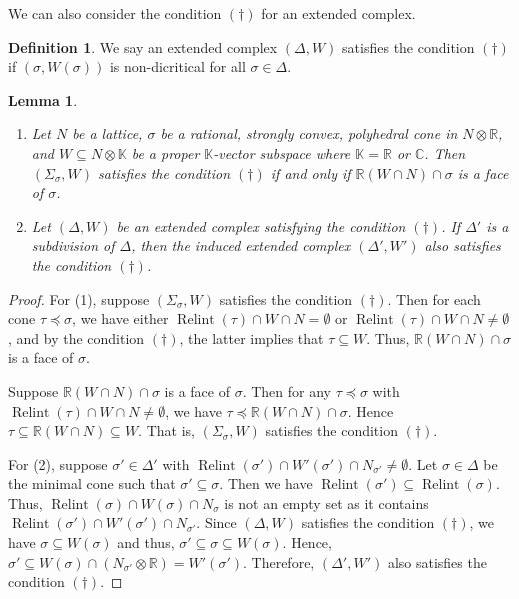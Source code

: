 \documentclass[12pt,reqno]{amsart}
\newtheorem{lemma}[theorem]{Lemma}
\theoremstyle{definition}
\newtheorem{definition}[theorem]{Definition}
\newcommand{\mb}{\mathbb}
\newcommand{\on}{\operatorname}
\newcommand\bC{{\mathbb C}}
\newcommand\bK{{\mathbb K}}
\newcommand\bR{{\mathbb R}}
\begin{document}
We can also consider the condition $(\dagger)$ for an extended complex.
\begin{definition}\label{def:dagger_extended_complex}
    We say an extended complex $(\Delta,W)$ satisfies the condition $(\dagger)$ if $(\sigma,W(\sigma))$ is non-dicritical for all $\sigma\in\Delta$.
\end{definition}

\begin{lemma}\label{lem_property_dagger}
\begin{enumerate}
    \item  Let $N$ be a lattice, $\sigma$ be a rational, strongly convex, polyhedral cone in $N\otimes\bR$, and $W\subseteq N\otimes\bK$ be a proper $\bK$-vector subspace where $\bK=\bR$ or $\bC$. Then $(\Sigma_\sigma,W)$ satisfies the condition $(\dagger)$ if and only if $\mb R(W\cap N)\cap \sigma$ is a face of $\sigma$.
    \item Let $(\Delta,W)$ be an extended complex satisfying the condition $(\dagger)$. 
    If $\Delta'$ is a subdivision of $\Delta$, then the induced extended complex $(\Delta',W')$ also satisfies the condition $(\dagger)$. 
\end{enumerate}
\end{lemma}
\begin{proof}
    For (1), suppose $(\Sigma_\sigma,W)$ satisfies the condition $(\dagger)$. 
    Then for each cone $\tau\preceq\sigma$, we have either $\on{Relint}(\tau)\cap W\cap N=\emptyset$ or $\on{Relint}(\tau)\cap W\cap N\neq\emptyset$, and by the condition $(\dagger)$, the latter implies that $\tau\subseteq W$. Thus, $\bR(W\cap N)\cap\sigma$ is a face of $\sigma$.

    Suppose $\bR(W\cap N)\cap\sigma$ is a face of $\sigma$. Then for any $\tau\preceq \sigma$ with $\on{Relint}(\tau)\cap W\cap N\neq\emptyset$, we have $\tau\preceq \bR(W\cap N)\cap\sigma$. Hence $\tau\subseteq \bR(W\cap N)\subseteq W$. That is, $(\Sigma_\sigma,W)$ satisfies the condition $(\dagger)$.

    For (2), suppose $\sigma'\in\Delta'$ with $\on{Relint}(\sigma')\cap W'(\sigma')\cap N_{\sigma'}\neq\emptyset$. 
    Let $\sigma\in\Delta$ be the minimal cone such that $\sigma'\subseteq\sigma$. 
    Then we have $\on{Relint}(\sigma')\subseteq\on{Relint}(\sigma)$. 
    Thus, $\on{Relint}(\sigma)\cap W(\sigma)\cap N_{\sigma}$ is not an empty set as it contains $\on{Relint}(\sigma')\cap W'(\sigma')\cap N_{\sigma'}$. 
    Since $(\Delta,W)$ satisfies the condition $(\dagger)$, we have $\sigma\subseteq W(\sigma)$ and thus, $\sigma'\subseteq\sigma\subseteq W(\sigma)$. 
    Hence, $\sigma'\subseteq W(\sigma)\cap (N_{\sigma'}\otimes\bR) = W'(\sigma')$. 
    Therefore, $(\Delta',W')$ also satisfies the condition $(\dagger)$. 
\end{proof}
\end{document}
